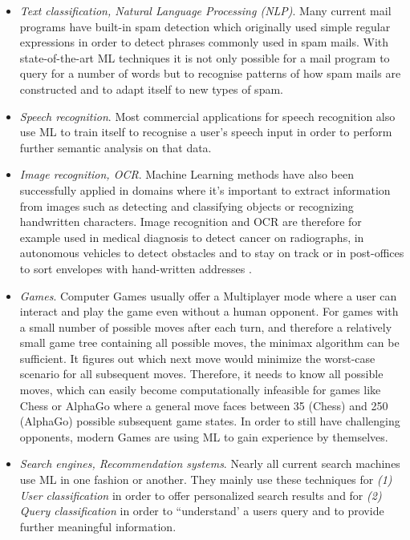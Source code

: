 \documentclass[conference]{IEEEtran}
\begin{document}
\begin{itemize}
    \item \textit{Text classification, Natural Language Processing (NLP)}. 
        Many current mail programs have built-in spam detection which originally used
        simple regular expressions in order to detect phrases commonly used in spam mails.
        With state-of-the-art ML techniques it is not only possible for a mail program to 
        query for a number of words but to recognise patterns of how spam mails are constructed and 
        to adapt itself to new types of spam.
    \item \textit{Speech recognition}. 
        Most commercial applications for speech recognition also use ML to train itself to 
        recognise a user's speech input in order to perform further semantic analysis on
        that data.
    \item \textit{Image recognition, OCR}.
        Machine Learning methods have also been successfully applied in domains where it's 
        important to extract information from images such as detecting and classifying 
        objects or recognizing handwritten characters. Image 
        recognition and OCR are therefore for example used in medical diagnosis to 
        detect cancer on radiographs, in autonomous vehicles to detect obstacles and to 
        stay on track or in post-offices to sort envelopes with hand-written addresses
        \cite{DisciplineOfML:mitchell}.
    \item \textit{Games}.
        Computer Games usually offer a Multiplayer mode where a user can interact and 
        play the game even without a human opponent. For games with a small number of 
        possible moves after each turn, and therefore a relatively small game tree containing 
        all possible moves, the minimax algorithm\cite{Prog2:bachmaier} can be sufficient. 
        It figures out which next move would minimize the worst-case scenario for all subsequent 
        moves. Therefore, it needs to know all possible moves, which can easily become computationally 
        infeasible for games like Chess or AlphaGo where a general move faces between 35 (Chess) and 
        250 (AlphaGo) possible subsequent game states.
        In order to still have challenging opponents, modern Games are using ML to gain experience 
        by themselves.
    \item \textit{Search engines, Recommendation systems}.
        Nearly all current search machines use ML in one fashion or another. They mainly use these 
        techniques for \textit{(1) User classification}\cite{DisciplineOfML:mitchell} in order to offer personalized 
        search results and for \textit{(2) Query classification} in order to ``understand' a 
        users query and to provide further meaningful information.
\end{itemize}
\end{document}

